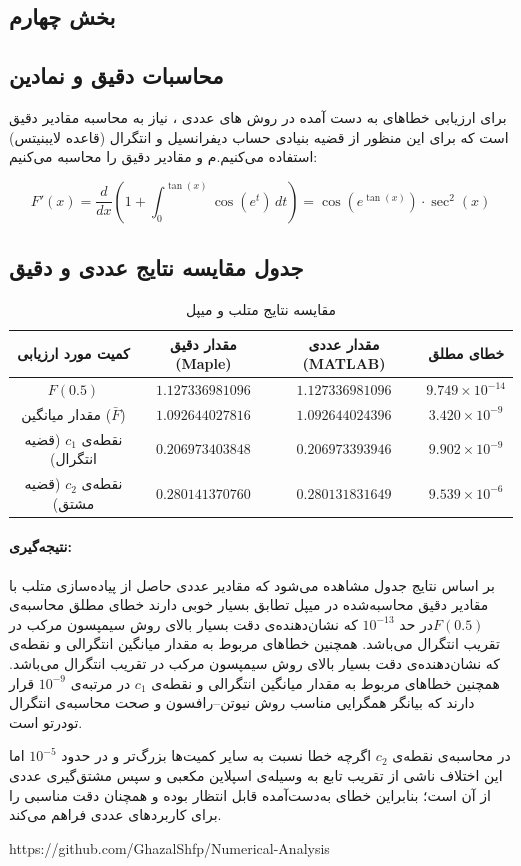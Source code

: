 \documentclass{article}
\begin{document}
\begin{flushright}
\section{بخش چهارم}
\subsection{محاسبات دقیق و نمادین}
برای ارزیابی خطاهای به دست آمده در روش های عددی ، نیاز به محاسبه مقادیر دقیق است که برای این منظور از قضیه بنیادی حساب دیفرانسیل و انتگرال (قاعده لایبنیتس) استفاده می‌کنیم.م و مقادیر دقیق را محاسبه می‌کنیم:

\begin{equation}
	F'(x) = \frac{d}{dx} \left( 1 + \int_0^{\tan(x)} \cos(e^t) \, dt \right) = \cos(e^{\tan(x)}) \cdot \sec^2(x)
\end{equation}

\subsection{جدول مقایسه نتایج عددی و دقیق}
\begin{table}[H]
	\centering
	\begin{tabular}{|c|c|c|c|}
		\hline
		\textbf{کمیت مورد ارزیابی} & \textbf{مقدار دقیق (Maple)} & \textbf{مقدار عددی (MATLAB)} & \textbf{خطای مطلق} \\ \hline
		$F(0.5)$ & $1.127336981096$ & $1.127336981096$ & $9.749 \times 10^{-14}$ \\ \hline
		مقدار میانگین ($\bar{F}$) & $1.092644027816$ & $1.092644024396$ & $3.420 \times 10^{-9}$ \\ \hline
		نقطه‌ی $c_1$ (قضیه انتگرال) & $0.206973403848$ & $0.206973393946$ & $9.902\times 10^{-9}$ \\ \hline
		نقطه‌ی $c_2$ (قضیه مشتق) & $0.280141370760$ & $0.280131831649$ & $9.539\times 10^{-6}$ \\ \hline
	\end{tabular}
	\caption{مقایسه نتایج متلب و میپل}
	\label{tab:final_comparison}
\end{table}
\paragraph{نتیجه‌گیری:}
بر اساس نتایج جدول مشاهده می‌شود که مقادیر عددی حاصل از پیاده‌سازی متلب با مقادیر دقیق محاسبه‌شده در میپل تطابق بسیار خوبی دارند خطای مطلق محاسبه‌ی$ F(0.5) $در حد $10^{-13}$ که نشان‌دهنده‌ی دقت بسیار بالای روش سیمپسون مرکب در تقریب انتگرال می‌باشد. همچنین خطاهای مربوط به مقدار میانگین انتگرالی و نقطه‌ی که نشان‌دهنده‌ی دقت بسیار بالای روش سیمپسون مرکب در تقریب انتگرال می‌باشد. همچنین خطاهای مربوط به مقدار میانگین انتگرالی و نقطه‌ی $c_1$ در مرتبه‌ی $10^{-9}$ قرار دارند که بیانگر همگرایی مناسب روش نیوتن–رافسون و صحت محاسبه‌ی انتگرال تودرتو است.

در محاسبه‌ی نقطه‌ی $c_2$ اگرچه خطا نسبت به سایر کمیت‌ها بزرگ‌تر و در حدود $10^{-5}$ اما این اختلاف ناشی از تقریب تابع به وسیله‌ی اسپلاین مکعبی و سپس مشتق‌گیری عددی از آن است؛ بنابراین خطای به‌دست‌آمده قابل انتظار بوده و همچنان دقت مناسبی را برای کاربردهای عددی فراهم می‌کند.
\end{flushright}
\begin{center}
	https://github.com/GhazalShfp/Numerical-Analysis
\end{center}
\end{document}
